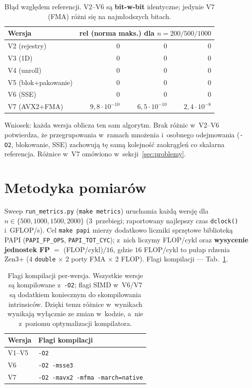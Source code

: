 \documentclass[11pt,a4paper]{article}
\begin{document}
\begin{table}[H]\centering
\begin{tabular}{lrrr}
\toprule
Wersja & \multicolumn{3}{c}{rel (norma maks.) dla $n=200/500/1000$} \\
\midrule
V2 (rejestry)        & $0$ & $0$ & $0$ \\
V3 (1D)              & $0$ & $0$ & $0$ \\
V4 (unroll)          & $0$ & $0$ & $0$ \\
V5 (blok+pakowanie)  & $0$ & $0$ & $0$ \\
V6 (SSE)             & $0$ & $0$ & $0$ \\
V7 (AVX2+FMA)        & $9{,}8\cdot10^{-10}$ & $6{,}5\cdot10^{-10}$ & $2{,}4\cdot10^{-8}$ \\
\bottomrule
\end{tabular}
\caption{Błąd względem referencji. V2--V6 są \textbf{bit-w-bit} identyczne; jedynie V7 (FMA)
różni się na najmłodszych bitach.}
\end{table}

Wniosek: każda wersja oblicza ten sam algorytm. Brak różnic w~V2--V6 potwierdza, że
przegrupowania w~ramach mnożenia i~osobnego odejmowania (\texttt{-O2}, blokowanie, SSE)
zachowują tę samą kolejność zaokrągleń co skalarna referencja. Różnice w~V7 omówiono
w~sekcji~\ref{sec:problemy}.

\section{Metodyka pomiarów}
Sweep \texttt{run\_metrics.py} (\texttt{make metrics}) uruchamia każdą wersję dla
$n\in\{500,1000,1500,2000\}$ (3~przebiegi; raportowany najlepszy czas \texttt{dclock()} i~GFLOP/s).
Cel \texttt{make papi} mierzy dodatkowo liczniki sprzętowe biblioteką PAPI
(\texttt{PAPI\_FP\_OPS}, \texttt{PAPI\_TOT\_CYC}); z~nich liczymy FLOP/cykl oraz \textbf{wysycenie
jednostek FP} $=$ (FLOP/cykl)$/16$, gdzie $16$ FLOP/cykl to pułap rdzenia Zen3+
($4$ \texttt{double} $\times$ 2 porty FMA $\times$ 2 FLOP). Flagi kompilacji --- Tab.~\ref{tab:flags}.

\begin{table}[H]\centering
\begin{tabular}{ll}
\toprule
Wersja & Flagi kompilacji \\
\midrule
V1--V5 & \texttt{-O2} \\
V6 & \texttt{-O2 -msse3} \\
V7 & \texttt{-O2 -mavx2 -mfma -march=native} \\
\bottomrule
\end{tabular}
\caption{Flagi kompilacji per-wersja. Wszystkie wersje są kompilowane z~\texttt{-O2};
flagi SIMD w~V6/V7 są dodatkiem koniecznym do skompilowania intrinsiców. Dzięki temu
różnice w~wynikach wynikają wyłącznie ze zmian w~kodzie, a~nie z~poziomu optymalizacji
kompilatora.}
\label{tab:flags}
\end{table}
\end{document}
